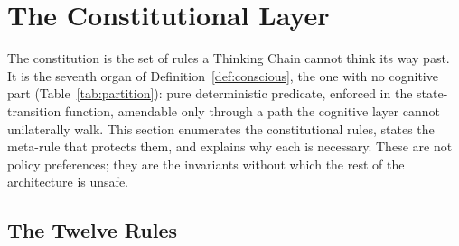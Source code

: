 \section{The Constitutional Layer}
\label{sec:constitution}

The constitution is the set of rules a Thinking Chain cannot think its way past. It is the seventh organ of Definition~\ref{def:conscious}, the one with no cognitive part (Table~\ref{tab:partition}): pure deterministic predicate, enforced in the state-transition function, amendable only through a path the cognitive layer cannot unilaterally walk. This section enumerates the constitutional rules, states the meta-rule that protects them, and explains why each is necessary. These are not policy preferences; they are the invariants without which the rest of the architecture is unsafe.

\subsection{The Twelve Rules}

